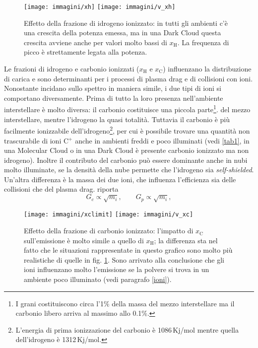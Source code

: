 \begin{figure}
	
	\centerline{
		\centering
		\subfigure
		{\texttt{[image: immagini/xh]}}
		\hspace{-5mm}
		\subfigure
		{\texttt{[image: immagini/v\_xh]}}
	}
	\caption{Effetto della frazione di idrogeno ionizzato: in tutti gli ambienti c'è una crescita della potenza emessa, ma in una Dark Cloud questa crescita avviene anche per valori molto bassi di $x_\mathrm{H}$. La frequenza di picco è strettamente legata alla potenza.}
	\label{plotxh}
\end{figure}
Le frazioni di idrogeno e carbonio ionizzati ($x_\mathrm{H}$ e $x_\mathrm{C}$) influenzano la distribuzione di carica e sono determinanti per i processi di plasma drag e di collisioni con ioni. Nonostante incidano sullo spettro in maniera simile, i due tipi di ioni si comportano diversamente. Prima di tutto la loro presenza nell'ambiente interstellare è molto diversa: il carbonio costituisce una piccola parte\footnote{I grani costituiscono circa l'1$\%$ della massa del mezzo interstellare ma il carbonio libero arriva al massimo allo 0.1$\%$.}. del mezzo interstellare, mentre l'idrogeno la quasi totalità. Tuttavia il carbonio è più facilmente ionizzabile dell'idrogeno\footnote{L'energia di prima ionizzazione del carbonio è 1086\,Kj/mol mentre quella dell'idrogeno è 1312\,Kj/mol.}, per cui è possibile trovare una quantità non trascurabile di ioni C$^+$ anche in ambienti freddi e poco illuminati (vedi \ref{tab1}, in una Molecular Cloud o in una Dark Cloud è presente carbonio ionizzato ma non idrogeno). Inoltre il contributo del carbonio può essere dominante anche in nubi molto illuminate, se la densità della nube permette che l'idrogeno sia \textit{self-shielded}. Un'altra differenza è la massa dei due ioni, che influenza l'efficienza sia delle collisioni che del plasma drag. \textcite{Ali} riporta
\begin{equation}
G_c \propto \sqrt{m_i}, \qquad G_p \propto \sqrt{m_i},
\end{equation}

\begin{figure}	
	\centerline{
		\centering
		\subfigure
		{\texttt{[image: immagini/xclimit]}}
		\hspace{-5mm}
		\subfigure
		{\texttt{[image: immagini/v\_xc]}}
	}
	\caption{Effetto della frazione di carbonio ionizzato: l'impatto di $x_\mathrm{C}$ sull'emissione è molto simile a quello di $x_\mathrm{H}$; la differenza sta nel fatto che le situazioni rappresentate in questo grafico sono molto più realistiche di quelle in fig. \ref{plotxh}. Sono arrivato alla conclusione che gli ioni influenzano molto l'emissione se la polvere si trova in un ambiente poco illuminato (vedi paragrafo \ref{ioni}).}
	\label{plotxc}
\end{figure}

